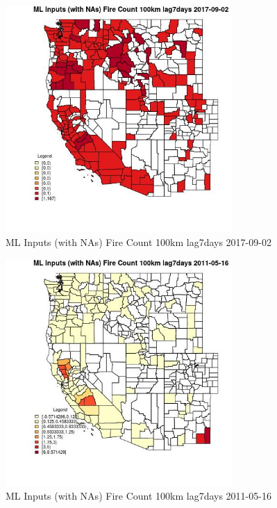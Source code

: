 \begin{figure} 
\centering  
\includegraphics[width=0.77\textwidth]{Code_Outputs/Report_ML_input_PM25_Step4_part_e_de_duplicated_aves_compiled_2019-05-20wNAs_CountyFire_Count_100km_lag7daysMean2017-09-02.jpg} 
\caption{\label{fig:Report_ML_input_PM25_Step4_part_e_de_duplicated_aves_compiled_2019-05-20wNAsCountyFire_Count_100km_lag7daysMean2017-09-02}ML Inputs (with NAs) Fire Count 100km lag7days 2017-09-02} 
\end{figure} 
 

\begin{figure} 
\centering  
\includegraphics[width=0.77\textwidth]{Code_Outputs/Report_ML_input_PM25_Step4_part_e_de_duplicated_aves_compiled_2019-05-20wNAs_CountyFire_Count_100km_lag7daysMean2011-05-16.jpg} 
\caption{\label{fig:Report_ML_input_PM25_Step4_part_e_de_duplicated_aves_compiled_2019-05-20wNAsCountyFire_Count_100km_lag7daysMean2011-05-16}ML Inputs (with NAs) Fire Count 100km lag7days 2011-05-16} 
\end{figure} 
 


